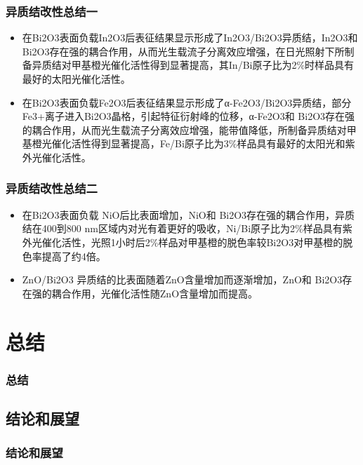 \documentclass[xetex,compress]{mybeamer}
\begin{document}
\begin{frame}
\frametitle{异质结改性总结一}
\begin{block}{}
\begin{itemize}
\item<1> 在Bi2O3表面负载In2O3后表征结果显示形成了In2O3/Bi2O3异质结，In2O3和 Bi2O3存在强的耦合作用，从而光生载流子分离效应增强，在日光照射下所制备异质结对甲基橙光催化活性得到显著提高，其In/Bi原子比为2\%时样品具有最好的太阳光催化活性。%
\item<2> 在Bi2O3表面负载Fe2O3后表征结果显示形成了α-Fe2O3/Bi2O3异质结，部分Fe3+离子进入Bi2O3晶格，引起特征衍射峰的位移，α-Fe2O3和 Bi2O3存在强的耦合作用，从而光生载流子分离效应增强，能带值降低，所制备异质结对甲基橙光催化活性得到显著提高，Fe/Bi原子比为3\%样品具有最好的太阳光和紫外光催化活性。
\end{itemize}
\end{block}
\end{frame}

\begin{frame}
\frametitle{异质结改性总结二}
\begin{block}{}
\begin{itemize}
\item<1> 在Bi2O3表面负载 NiO后比表面增加，NiO和 Bi2O3存在强的耦合作用，异质结在400到800 nm区域内对光有着更好的吸收，Ni/Bi原子比为2\%样品具有紫外光催化活性，光照1小时后2\%样品对甲基橙的脱色率较Bi2O3对甲基橙的脱色率提高了约4倍。%
\item<2> ZnO/Bi2O3 异质结的比表面随着ZnO含量增加而逐渐增加，ZnO和 Bi2O3存在强的耦合作用，光催化活性随ZnO含量增加而提高。
\end{itemize}
\end{block}
\end{frame}



\section{总结}
\begin{frame}
\frametitle{总结}
\end{frame}


\subsection{结论和展望}
\begin{frame}
\frametitle{结论和展望}

\end{frame}
\end{document}
